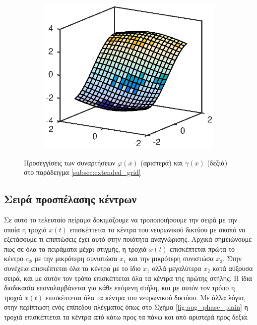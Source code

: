 \begin{figure}
	\begin{subfigure}{0.5\textwidth}
		\includegraphics{plots/conclusions/robot_like_extended/phi_approx.eps}
	\end{subfigure}
	\begin{subfigure}{0.5\textwidth}
		
	\end{subfigure}
	\caption{Προσεγγίσεις των συναρτήσεων $\varphi(x)$ (αριστερά) και $\gamma(x)$ (δεξιά) στο παράδειγμα \ref{subsec:extended_grid}}
	\label{fig:robot_like_extended_approximations}
\end{figure}

\subsection{Σειρά προσπέλασης κέντρων}
\label{subsec:mixed_order}
Σε αυτό το τελευταίο πείραμα δοκιμάζουμε να τροποποιήσουμε την σειρά με την οποία η τροχιά $x(t)$ επισκέπτεται τα κέντρα του νευρωνικού δικτύου με σκοπό να εξετάσουμε τι επιπτώσεις έχει αυτό στην ποιότητα αναγνώρισης. Αρχικά σημειώνουμε πως σε όλα τα πειράματα μέχρι στιγμής, η τροχιά $x(t)$ επισκέπτεται πρώτα το κέντρο $c_\Phi$ με την μικρότερη συνιστώσα $x_1$ και την μικρότερη συνιστώσα $x_2$. Στην συνέχεια επισκέπτεται όλα τα κέντρα με το ίδιο $x_1$ αλλά μεγαλύτερα $x_2$ κατά αύξουσα σειρά, και με αυτόν τον τρόπο επισκέπτεται όλα τα κέντρα της πρώτης στήλης. Η ίδια διαδικασία επαναλαμβάνεται για κάθε επόμενη στήλη, και με αυτόν τον τρόπο η τροχιά $x(t)$ επισκέπτεται όλα τα κέντρα του νευρωνικού δικτύου. Με άλλα λόγια, στην περίπτωση ενός επίπεδου πλέγματος όπως στο Σχήμα \ref{fig:aug_phase_plain} η τροχιά επισκέπτεται τα κέντρα από κάτω προς τα πάνω και από αριστερά προς δεξιά.

